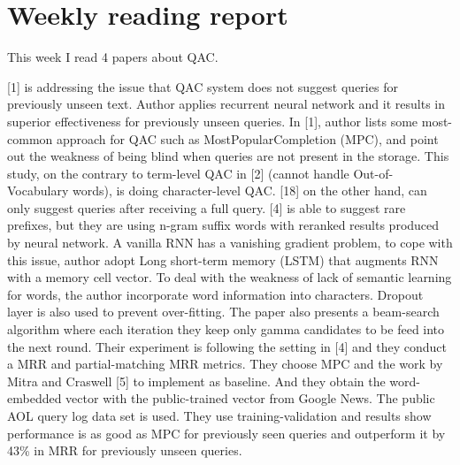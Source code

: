 \documentclass[12pt]{article} %
\begin{document}
\section*{Weekly reading report} %
This week I read 4 papers about QAC.

[1] is addressing the issue that QAC system does not suggest queries for previously unseen text. Author applies recurrent neural network and it results in superior effectiveness for previously unseen queries. In [1], author lists some most-common approach for QAC such as MostPopularCompletion (MPC), and point out the weakness of being blind when queries are not present in the storage. This study, on the contrary to term-level QAC in [2] (cannot handle Out-of-Vocabulary words), is doing character-level QAC. [18] on the other hand, can only suggest queries after receiving a full query. [4] is able to suggest rare prefixes, but they are using n-gram suffix words with reranked results produced by neural network. A vanilla RNN has a vanishing gradient problem, to cope with this issue, author adopt Long short-term memory (LSTM) that augments RNN with a memory cell vector. To deal with the weakness of lack of semantic learning for words, the author incorporate word information into characters. Dropout layer is also used to prevent over-fitting. The paper also presents a beam-search algorithm where each iteration they keep only gamma candidates to be feed into the next round. Their experiment is following the setting in [4] and they conduct a MRR and partial-matching MRR metrics. They choose MPC and the work by Mitra and Craswell [5] to implement as baseline. And they obtain the word-embedded vector with the public-trained vector from Google News. The public AOL query log data set is used. They use training-validation and results show performance is as good as MPC for previously seen queries and outperform it by 43\% in MRR for previously unseen queries.
\end{document}
